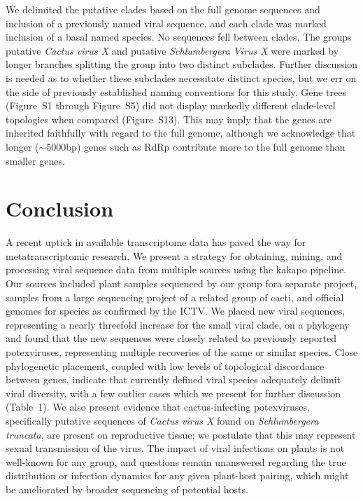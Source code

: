 \documentclass[fleqn,10pt,lineno]{wlpeerj}
\begin{document}
{We delimited the putative clades based on the full genome sequences and inclusion of a previously named viral sequence, and each clade was marked inclusion of a basal named species.
No sequences fell between clades.
The groups putative \textit{Cactus virus X} and putative \textit{Schlumbergera Virus X} were marked by longer branches splitting the group into two distinct subclades. 
Further discussion is needed as to whether these subclades necessitate distinct species, but we err on the side of previously established naming conventions for this study.
Gene trees ({Figure~S1} through {Figure~S5}) did not display markedly different clade-level topologies when compared ({Figure~S13}). 
This may imply that the genes are inherited faithfully with regard to the full genome, although we acknowledge that longer ($\sim$5000bp) genes such as RdRp contribute more to the full genome than smaller genes.


\section*{Conclusion}
A recent uptick in available transcriptome data has paved the way for metatranscriptomic research.
We present a strategy for obtaining, mining, and processing viral sequence data from multiple sources using the kakapo pipeline.
Our sources included plant samples sequenced by our group fora separate project, samples from a large sequencing project of a related group of cacti, and official genomes for species as confirmed by the ICTV.
We placed new viral sequences, representing a nearly threefold increase for the small viral clade, on a phylogeny and found that the new sequences were closely related to previously reported potexviruses, representing multiple recoveries of the same or similar species.
Close phylogenetic placement, coupled with low levels of topological discordance between genes, indicate that currently defined viral species adequately delimit viral diversity, with a few outlier cases which we present for further discussion ({Table~1}).
We also present evidence that cactus-infecting potexviruses, specifically putative sequences of \textit{Cactus virus X} found on \textit{Schlumbergera truncata}, are present on reproductive tissue; we postulate that this may represent sexual transmission of the virus.
The impact of viral infections on plants is not well-known for any group, and questions remain unanswered regarding the true distribution or infection dynamics for any given plant-host pairing, which might be ameliorated by broader sequencing of potential hosts. 


}
\end{document}
